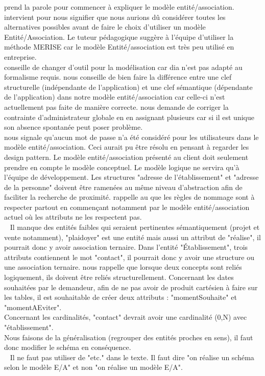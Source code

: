 \documentclass [a4paper] {article}
\begin{document}
\Julie{} prend la parole pour commencer à expliquer le modèle entité/association.
\nomTuteurPedago{} intervient pour nous signifier que nous aurions dû considérer toutes les alternatives possibles avant de  faire le choix d'utiliser un modèle Entité/Association. Le tuteur pédagogique suggère à l'équipe d'utiliser la méthode MERISE car le modèle Entité/association est très peu utilisé en entreprise. \\
\nomTuteurPedago{} conseille de changer d'outil pour la modélisation car dia n'est pas adapté au formalisme requis. \nomTuteurPedago{} nous conseille de bien faire la différence entre une clef structurelle (indépendante de l'application) et une clef sémantique (dépendante de l'application) dans notre modèle entité/association car celle-ci n'est actuellement pas faite de manière correcte.
\nomTuteurPedago{} nous demande de corriger la contrainte d'administrateur globale en en assignant plusieurs car si il est unique son absence spontanée peut poser problème. \\
\nomTuteurPedago{} nous signale qu'aucun mot de passe n'a été considéré pour les utilisateurs dans le modèle entité/association. Ceci aurait pu être résolu en pensant à regarder les design pattern. 
Le modèle entité/association présenté au client doit seulement prendre en compte le modèle conceptuel. Le modèle logique ne servira qu'à l'équipe de développement. 
Les structures "adresse de l'établissement" et "adresse de la personne" doivent être ramenées au même niveau d'abstraction afin de faciliter la recherche de proximité.
\nomTuteurPedago{} rappelle au \RGC que les règles de nommage sont à respecter partout en commençant notamment par le modèle entité/association actuel où les attributs ne les respectent pas.
\\ ~
Il manque des entités faibles qui seraient pertinentes sémantiquement (projet et vente notamment), "plaidoyer" est une entité mais aussi un attribut de "réalise", il pourrait donc y avoir association ternaire. Dans l'entité "Établissement", trois attributs contiennent le mot "contact", il pourrait donc y avoir une structure ou une association ternaire. \nomTuteurPedago{} nous rappelle que lorsque deux concepts sont reliés logiquement, ils doivent être reliés structurellement. Concernant les dates souhaitées par le demandeur, afin de ne pas avoir de produit cartésien à faire sur les tables, il est souhaitable de créer deux attributs : "momentSouhaite" et "momentAEviter".
\\
Concernant les cardinalités, "contact" devrait avoir une cardinalité (0,N) avec "établissement".
\\
Nous faisons de la généralisation (regrouper des entités proches en sens), il faut donc modifier le schéma en conséquence.
\\ ~
Il ne faut pas utiliser de "etc." dans le texte. Il faut dire "on réalise un schéma selon le modèle E/A" et non "on réalise un modèle E/A".
\end{document}
